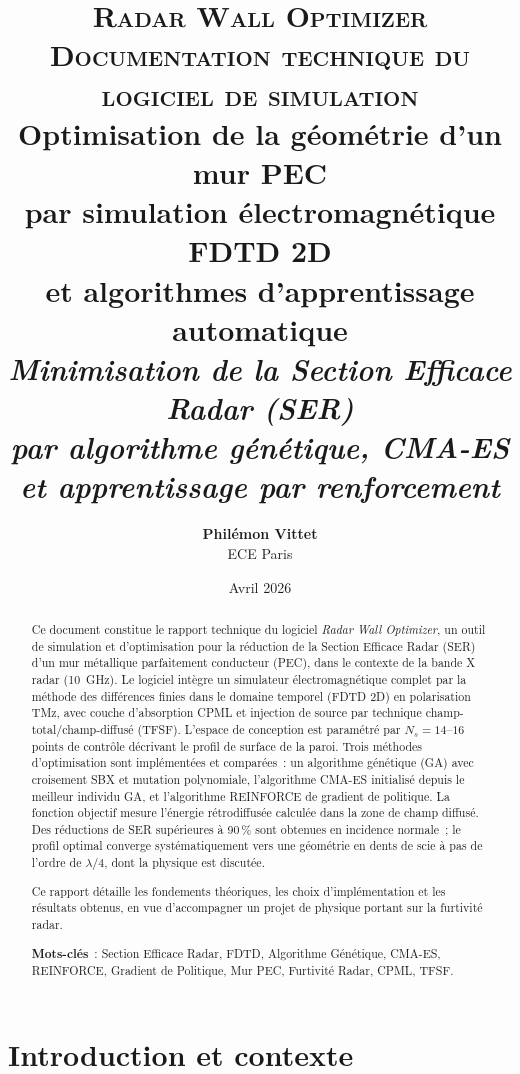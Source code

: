 \documentclass[12pt,a4paper]{article}
\title{
    \vspace{-1cm}
    {\large\textsc{Radar Wall Optimizer} \\[2pt]
     \textsc{Documentation technique du logiciel de simulation}}\\[1.5cm]
    {\LARGE\bfseries Optimisation de la géométrie d'un mur PEC\\
     par simulation électromagnétique FDTD 2D\\[4pt]
     et algorithmes d'apprentissage automatique}\\[0.8cm]
    {\large\textit{Minimisation de la Section Efficace Radar (SER)\\
     par algorithme génétique, CMA-ES et apprentissage par renforcement}}
}
\author{
    \textbf{Philémon Vittet}\\[4pt]
    \small ECE Paris
}
\date{Avril 2026}
\begin{document}
\maketitle
\thispagestyle{empty}

\begin{abstract}
\noindent
Ce document constitue le rapport technique du logiciel \textit{Radar Wall Optimizer},
un outil de simulation et d'optimisation pour la réduction de la Section Efficace
Radar (SER) d'un mur métallique parfaitement conducteur (PEC), dans le contexte
de la bande X radar (\SI{10}{\giga\hertz}). Le logiciel intègre un simulateur
électromagnétique complet par la méthode des différences finies dans le domaine
temporel (FDTD 2D) en polarisation TMz, avec couche d'absorption CPML et injection
de source par technique champ-total/champ-diffusé (TFSF). L'espace de conception
est paramétré par $N_s = 14$--$16$ points de contrôle décrivant le profil de
surface de la paroi. Trois méthodes d'optimisation sont implémentées et comparées~:
un algorithme génétique (GA) avec croisement SBX et mutation polynomiale,
l'algorithme CMA-ES initialisé depuis le meilleur individu GA, et l'algorithme
REINFORCE de gradient de politique. La fonction objectif mesure l'énergie
rétrodiffusée calculée dans la zone de champ diffusé. Des réductions de SER
supérieures à 90\,\% sont obtenues en incidence normale~; le profil optimal
converge systématiquement vers une géométrie en dents de scie à pas de l'ordre
de $\lambda/4$, dont la physique est discutée.

Ce rapport détaille les fondements théoriques, les choix d'implémentation
et les résultats obtenus, en vue d'accompagner un projet de physique portant
sur la furtivité radar.

\smallskip
\noindent\textbf{Mots-clés}~: Section Efficace Radar, FDTD, Algorithme Génétique,
CMA-ES, REINFORCE, Gradient de Politique, Mur PEC, Furtivité Radar, CPML, TFSF.
\end{abstract}

\newpage
\tableofcontents
\newpage

\section{Introduction et contexte}
\label{sec:intro}
\end{document}
